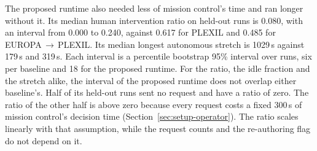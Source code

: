 The proposed runtime also needed less of mission control's time and ran longer without it. Its median human
intervention ratio on held-out runs is 0.080, with an interval from 0.000 to 0.240, against 0.617 for PLEXIL and 0.485
for EUROPA\,$\rightarrow$\,PLEXIL. Its median longest autonomous stretch is 1029\,s against 179\,s and 319\,s. Each
interval is a percentile bootstrap 95\% interval over runs, six per baseline and 18 for the proposed runtime. For the
ratio, the idle fraction and the stretch alike, the interval of the proposed runtime does not overlap either
baseline's. Half of its held-out runs sent no request and have a ratio of zero. The ratio of the other half is above
zero because every request costs a fixed 300\,s of mission control's decision time (Section~\ref{sec:setup-operator}).
The ratio scales linearly with that assumption, while the request counts and the re-authoring flag do not depend on
it.

